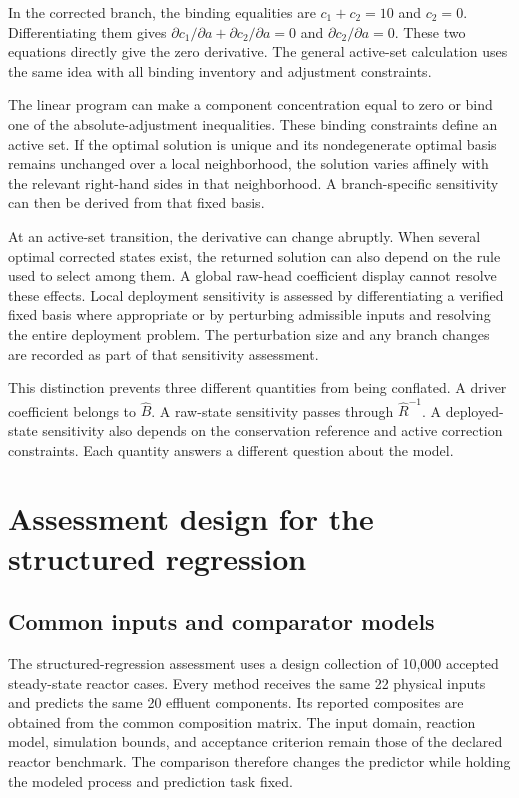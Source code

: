 In the corrected branch, the binding equalities are \(c_1+c_2=10\) and \(c_2=0\). Differentiating them gives \(\partial c_1/\partial a+\partial c_2/\partial a=0\) and \(\partial c_2/\partial a=0\). These two equations directly give the zero derivative. The general active-set calculation uses the same idea with all binding inventory and adjustment constraints.

The linear program can make a component concentration equal to zero or bind one of the absolute-adjustment inequalities. These binding constraints define an active set. If the optimal solution is unique and its nondegenerate optimal basis remains unchanged over a local neighborhood, the solution varies affinely with the relevant right-hand sides in that neighborhood. A branch-specific sensitivity can then be derived from that fixed basis.

At an active-set transition, the derivative can change abruptly. When several optimal corrected states exist, the returned solution can also depend on the rule used to select among them. A global raw-head coefficient display cannot resolve these effects. Local deployment sensitivity is assessed by differentiating a verified fixed basis where appropriate or by perturbing admissible inputs and resolving the entire deployment problem. The perturbation size and any branch changes are recorded as part of that sensitivity assessment.

This distinction prevents three different quantities from being conflated. A driver coefficient belongs to \(\widehat B\). A raw-state sensitivity passes through \(\widehat R^{-1}\). A deployed-state sensitivity also depends on the conservation reference and active correction constraints. Each quantity answers a different question about the model.

\section{Assessment design for the structured regression}

\subsection{Common inputs and comparator models}

The structured-regression assessment uses a design collection of 10,000 accepted steady-state reactor cases. Every method receives the same 22 physical inputs and predicts the same 20 effluent components. Its reported composites are obtained from the common composition matrix. The input domain, reaction model, simulation bounds, and acceptance criterion remain those of the declared reactor benchmark. The comparison therefore changes the predictor while holding the modeled process and prediction task fixed.

